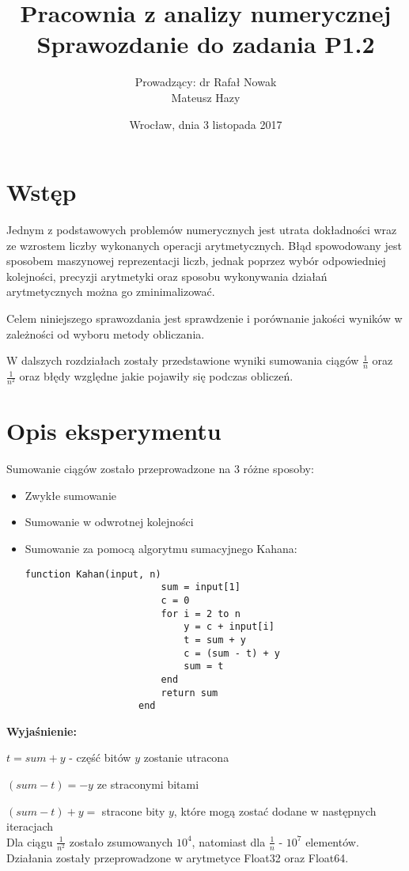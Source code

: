 \documentclass{article}
\title{\textbf{Pracownia z analizy numerycznej} \\ Sprawozdanie do zadania \textbf{P1.2}}
\author{Prowadzący: dr Rafał Nowak \\ Mateusz Hazy}
\date{Wrocław, dnia 3 listopada 2017}
\begin{document}
	\maketitle
	\section{Wstęp}
	Jednym z podstawowych problemów numerycznych jest utrata dokładności wraz ze wzrostem liczby wykonanych operacji arytmetycznych. Błąd spowodowany jest sposobem maszynowej reprezentacji liczb, jednak poprzez wybór odpowiedniej kolejności, precyzji arytmetyki oraz sposobu wykonywania działań arytmetycznych można go zminimalizować. 
		\par
			Celem niniejszego sprawozdania jest sprawdzenie i porównanie jakości wyników w zależności od wyboru metody obliczania.
		\par W dalszych rozdziałach zostały przedstawione wyniki sumowania ciągów $\frac{1}{n}$ oraz $\frac{1}{n^2}$ oraz błędy względne jakie pojawiły się podczas obliczeń.
	\section{Opis eksperymentu}
		\par Sumowanie ciągów zostało przeprowadzone na 3 różne sposoby:
		\begin{itemize}
			\item Zwykłe sumowanie 
			\item Sumowanie w odwrotnej kolejności
			\item Sumowanie za pomocą algorytmu sumacyjnego Kahana:
		
				\begin{lstlisting}[frame=single]
					function Kahan(input, n)
						sum = input[1]
						c = 0
						for i = 2 to n
							y = c + input[i]
							t = sum + y 
							c = (sum - t) + y 
							sum = t
						end
						return sum
					end  
				\end{lstlisting}
		\end{itemize}
		
		\textbf{Wyjaśnienie:} 
			\par $t = sum + y$ - część bitów $y$ zostanie utracona 
			\par $(sum-t) = -y$ ze straconymi bitami 
			\par $(sum-t) + y =$ stracone bity $y$, które mogą zostać dodane w następnych iteracjach \\
		
		Dla ciągu $\frac{1}{n^2}$ zostało zsumowanych $10^4$, natomiast dla $\frac{1}{n}$ - $10^7$ elementów. Działania zostały 				        przeprowadzone w arytmetyce Float32 oraz Float64.
\end{document}
